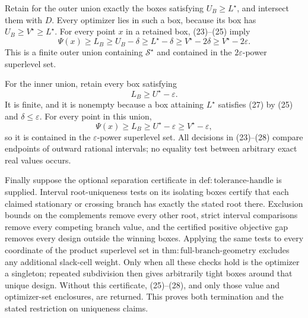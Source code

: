 Retain for the outer union exactly the boxes satisfying \(U_B\geq L^{\star}\), and intersect them with \(D\).  Every optimizer lies in such a box, because its box has \(U_B\geq V^{\star}\geq L^{\star}\).  For every point \(x\) in a retained box, (23)--(25) imply
\[
\Psi(x)\geq L_B
\geq U_B-\delta
\geq L^{\star}-\delta
\geq V^{\star}-2\delta
\geq V^{\star}-2\varepsilon.                                    \tag{26}
\]
This is a finite outer union containing \(\mathcal S^{\star}\) and contained in the \(2\varepsilon\)-power superlevel set.

For the inner union, retain every box satisfying
\[
L_B\geq U^{\star}-\varepsilon.                                   \tag{27}
\]
It is finite, and it is nonempty because a box attaining \(L^{\star}\) satisfies (27) by (25) and \(\delta\leq\varepsilon\).  For every point in this union,
\[
\Psi(x)\geq L_B\geq U^{\star}-\varepsilon
\geq V^{\star}-\varepsilon,                                     \tag{28}
\]
so it is contained in the \(\varepsilon\)-power superlevel set.  All decisions in (23)--(28) compare endpoints of outward rational intervals; no equality test between arbitrary exact real values occurs.

Finally suppose the optional separation certificate in \(\mathrm{def{:}tolerance\mbox{-}handle}\) is supplied.  Interval root-uniqueness tests on its isolating boxes certify that each claimed stationary or crossing branch has exactly the stated root there.  Exclusion bounds on the complements remove every other root, strict interval comparisons remove every competing branch value, and the certified positive objective gap removes every design outside the winning boxes.  Applying the same tests to every coordinate of the product superlevel set in \(\mathrm{thm{:}full\mbox{-}branch\mbox{-}geometry}\) excludes any additional slack-cell weight.  Only when all these checks hold is the optimizer a singleton; repeated subdivision then gives arbitrarily tight boxes around that unique design.  Without this certificate, (25)--(28), and only those value and optimizer-set enclosures, are returned.  This proves both termination and the stated restriction on uniqueness claims.
